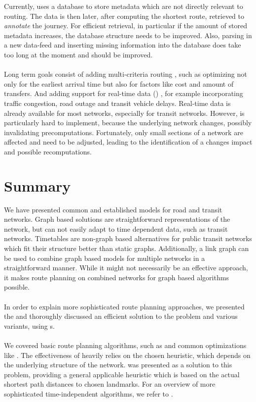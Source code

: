 	Currently, \cobweb uses a database to store metadata which are not directly relevant to routing. The data is then later, after computing
	the shortest route, retrieved to \textit{annotate} the journey. For efficient retrieval, in particular if the amount of stored metadata increases,
	the database structure needs to be improved. Also, parsing in a new data-feed and inserting missing information into the database does take
	too long at the moment and should be improved.\\\\
	Long term goals consist of adding multi-criteria routing , such as optimizing not only for the earliest arrival time but
	also for factors like cost and amount of transfers. And adding support for real-time data (\rtd) , for example incorporating traffic
	congestion, road outage and transit vehicle delays.
	Real-time data is already available for most networks, especially for transit networks. However, \rtd is particularly hard to implement,
	because the underlying network changes, possibly invalidating precomputations. Fortunately, only small sections of a
	network are affected and need to be adjusted, leading to the identification of a changes impact and possible recomputations.

\section{Summary}
	We have presented common and established models for road and transit networks. Graph based solutions are straightforward representations of the network,
	but can not easily adapt to time dependent data, such as transit networks. Timetables are non-graph based alternatives for public transit networks
	which fit their structure better than static graphs. Additionally, a link graph can be used to combine graph based models for multiple networks in a
	straightforward manner. While it might not necessarily be an effective approach, it makes route planning on combined networks for graph based
	algorithms possible.\\\\
	In order to explain more sophisticated route planning approaches, we presented the \nearestNeighborProblem and thoroughly discussed an
	efficient solution to the problem and various variants, using {\coverTree}s.\\\\
	We covered basic route planning algorithms, such as \dijkstra and common optimizations like \astar. The effectiveness of \astar heavily relies on the chosen
	heuristic, which depends on the underlying structure of the network. \alt was presented as a solution to this problem, providing a general applicable heuristic
	which is based on the actual shortest path distances to chosen landmarks. For an overview of more sophisticated \uniModal time-independent
	algorithms, we refer to .
	
